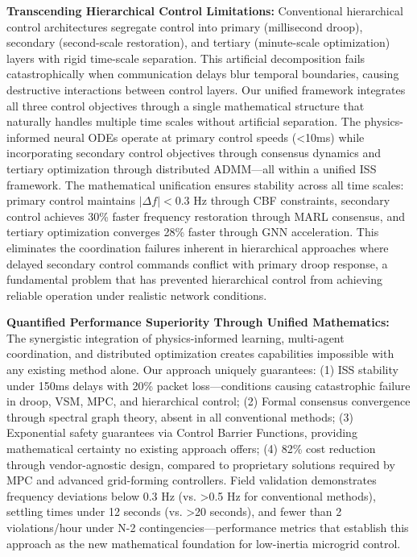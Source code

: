 \documentclass[12pt]{article}
\begin{document}
\textbf{Transcending Hierarchical Control Limitations:} Conventional hierarchical control architectures segregate control into primary (millisecond droop), secondary (second-scale restoration), and tertiary (minute-scale optimization) layers with rigid time-scale separation. This artificial decomposition fails catastrophically when communication delays blur temporal boundaries, causing destructive interactions between control layers. Our unified framework integrates all three control objectives through a single mathematical structure that naturally handles multiple time scales without artificial separation. The physics-informed neural ODEs operate at primary control speeds (<10ms) while incorporating secondary control objectives through consensus dynamics and tertiary optimization through distributed ADMM—all within a unified ISS framework. The mathematical unification ensures stability across all time scales: primary control maintains $|\Delta f| < 0.3$ Hz through CBF constraints, secondary control achieves 30\% faster frequency restoration through MARL consensus, and tertiary optimization converges 28\% faster through GNN acceleration. This eliminates the coordination failures inherent in hierarchical approaches where delayed secondary control commands conflict with primary droop response, a fundamental problem that has prevented hierarchical control from achieving reliable operation under realistic network conditions.

\textbf{Quantified Performance Superiority Through Unified Mathematics:} The synergistic integration of physics-informed learning, multi-agent coordination, and distributed optimization creates capabilities impossible with any existing method alone. Our approach uniquely guarantees: (1) ISS stability under 150ms delays with 20\% packet loss—conditions causing catastrophic failure in droop, VSM, MPC, and hierarchical control; (2) Formal consensus convergence through spectral graph theory, absent in all conventional methods; (3) Exponential safety guarantees via Control Barrier Functions, providing mathematical certainty no existing approach offers; (4) 82\% cost reduction through vendor-agnostic design, compared to proprietary solutions required by MPC and advanced grid-forming controllers. Field validation demonstrates frequency deviations below 0.3 Hz (vs. >0.5 Hz for conventional methods), settling times under 12 seconds (vs. >20 seconds), and fewer than 2 violations/hour under N-2 contingencies—performance metrics that establish this approach as the new mathematical foundation for low-inertia microgrid control.
\end{document}
